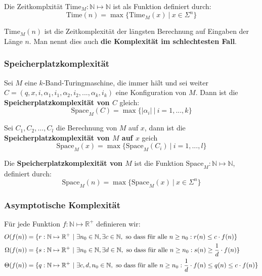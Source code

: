 \documentclass[11pt]{article}
\newcommand{\ttc}{\text{Time}}
\newcommand{\tsc}{\text{Space}}
\begin{document}
Die Zeitkomplxit{\"a}t $\ttc_M: \mathbb{N} \mapsto \mathbb{N}$ ist als Funktion definiert durch:
\begin{equation*}
	\ttc(n) = \max\{\ttc_M(x)\ |\ x \in \Sigma^n\}
\end{equation*}

$\ttc_M(n)$ ist die Zeitkomplexit{\"a}t der l{\"a}ngsten Berechnung auf Eingaben der L{\"a}nge $n$. Man nennt dies auch \textbf{die Komplexit{\"a}t im schlechtesten Fall}.

\subsubsection{Speicherplatzkomplexit{\"a}t}

Sei $M$ eine $k$-Band-Turingmaschine, die immer h{\"a}lt und sei weiter $C = (q, x, i, \alpha_1, i_1, \alpha_2, i_2,..., \alpha_k, i_k)$ eine Konfiguration von $M$. Dann ist die \textbf{Speicherplatzkomplexit{\"a}t von $C$} gleich:
\begin{equation*}
	\tsc_M(C) = \max\{|\alpha_i|\ |\ i = 1,...,k\}
\end{equation*}

Sei $C_1, C_2,..., C_l$ die Berechnung von $M$ auf $x$, dann ist die \textbf{Speicherplatzkomplexit{\"a}t von $M$ auf $x$} geich
\begin{equation*}
	\tsc_M(x) = \max\{\tsc_M(C_i)\ |\ i = 1,...,l\}
\end{equation*}

Die \textbf{Speicherplatzkomplexit{\"a}t von $M$} ist die Funktion $\tsc_M: \mathbb{N} \mapsto \mathbb{N}$, definiert durch:
\begin{equation*}
	\tsc_M(n) = \max\{\tsc_M(x)\ |\ x \in \Sigma^n\}
\end{equation*}

\subsubsection{Asymptotische Komplexit{\"a}t}

F{\"u}r jede Funktion $f: \mathbb{N} \mapsto \mathbb{R}^+$ definieren wir:
\begin{equation*}
\begin{split}
	O(f(n)) & = \{r: \mathbb{N} \mapsto \mathbb{R}^+\ |\ \exists n_0 \in \mathbb{N}, \exists c \in \mathbb{N}, \text{ so dass f{\"u}r alle $n \geq n_0: r(n) \leq c\cdot f(n)$}\}  \\
	\Omega(f(n)) & = \{s: \mathbb{N} \mapsto \mathbb{R}^+\ |\ \exists n_0 \in \mathbb{N}, \exists d \in \mathbb{N}, \text{ so dass f{\"u}r alle $n \geq n_0: s(n) \geq \frac{1}{d}\cdot f(n)$}\}  \\
	\Theta(f(n)) & = \{q: \mathbb{N} \mapsto \mathbb{R}^+\ |\ \exists c,d,n_0 \in \mathbb{N}, \text{ so dass f{\"u}r alle $ n \geq n_0: \frac{1}{d}\cdot f(n) \leq q(n) \leq c\cdot f(n)$}\}  \\
\end{split}
\end{equation*}
\end{document}
